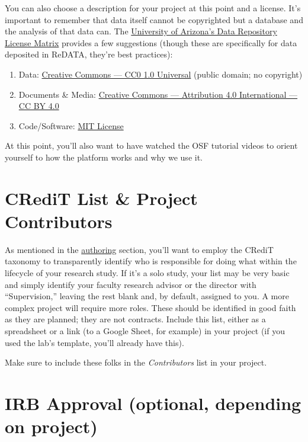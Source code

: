 \documentclass[]{tufte-book}
\providecommand{\tightlist}{%
  \setlength{\itemsep}{0pt}\setlength{\parskip}{0pt}}
\begin{document}
You can also choose a description for your project at this point and a license. It's important to remember that data itself cannot be copyrighted but a database and the analysis of that data can. The \href{https://osf.io/f57nz/}{University of Arizona's Data Repository License Matrix} provides a few suggestions (though these are specifically for data deposited in ReDATA, they're best practices):

\begin{enumerate}
\def\labelenumi{\arabic{enumi}.}
\tightlist
\item
  Data: \href{https://creativecommons.org/publicdomain/zero/1.0/}{Creative Commons --- CC0 1.0 Universal} (public domain; no copyright)
\item
  Documents \& Media: \href{https://creativecommons.org/licenses/by/4.0/}{Creative Commons --- Attribution 4.0 International --- CC BY 4.0}
\item
  Code/Software: \href{https://choosealicense.com/licenses/mit/}{MIT License}
\end{enumerate}

At this point, you'll also want to have watched the OSF tutorial videos to orient yourself to how the platform works and why we use it.

\hypertarget{credit-list-project-contributors}{%
\section{CRediT List \& Project Contributors}\label{credit-list-project-contributors}}

As mentioned in the \protect\hyperlink{authorship}{authoring} section, you'll want to employ the CRediT taxonomy to transparently identify who is responsible for doing what within the lifecycle of your research study. If it's a solo study, your list may be very basic and simply identify your faculty research advisor or the director with ``Supervision,'' leaving the rest blank and, by default, assigned to you. A more complex project will require more roles. These should be identified in good faith as they are planned; they are not contracts. Include this list, either as a spreadsheet or a link (to a Google Sheet, for example) in your project (if you used the lab's template, you'll already have this).

Make sure to include these folks in the \emph{Contributors} list in your project.

\hypertarget{irb-approval-optional-depending-on-project}{%
\section{IRB Approval (optional, depending on project)}\label{irb-approval-optional-depending-on-project}}
\end{document}
